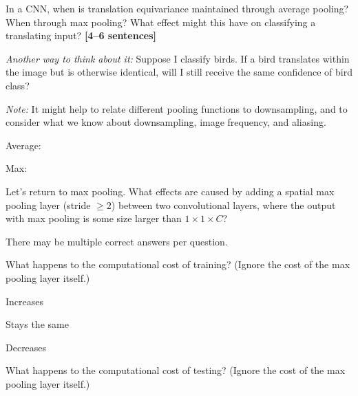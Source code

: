 \documentclass{csci1430}
\begin{document}
\begin{subquestion}[points=3]
In a CNN, when is translation equivariance maintained through average pooling? When through max pooling? What effect might this have on classifying a translating input? \textbf{[4--6 sentences]}
\end{subquestion}

\vspace{0.5em}
\emph{Another way to think about it:} Suppose I classify birds. If a bird translates within the image but is otherwise identical, will I still receive the same confidence of bird class?

\vspace{0.5em}
\emph{Note:} It might help to relate different pooling functions to downsampling, and to consider what we know about downsampling, image frequency, and aliasing.

\begin{answer}[height=12]
Average:

Max:
\end{answer}


\pagebreak
\begin{question}[points=5,drawbox=false] 
Let's return to max pooling. What effects are caused by adding a spatial max pooling layer (stride $\geq2$) between two convolutional layers, where the output with max pooling is some size larger than $1 \times 1 \times C$?

There may be multiple correct answers per question.
\end{question}

\begin{subquestion}[points=1]
What happens to the computational cost of training? (Ignore the cost of the max pooling layer itself.)
\end{subquestion}

\begin{answerlist}
    \item Increases %
    \item Stays the same
    \item Decreases
\end{answerlist}
    
\begin{subquestion}[points=1]
What happens to the computational cost of testing? (Ignore the cost of the max pooling layer itself.)
\end{subquestion}
\end{document}
